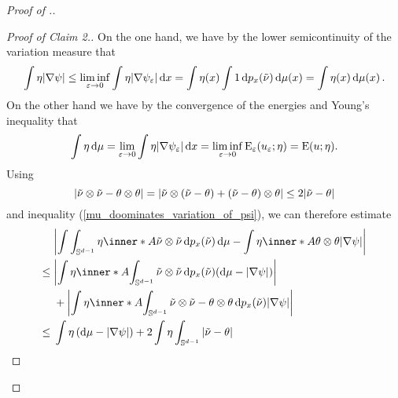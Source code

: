 \begin{proof}[Proof of .]
\begin{proof}[Proof of Claim 2.]
		On the one hand, we have by the lower semicontinuity of the variation 
		measure that
		\begin{equation}
			\label{mu_doominates_variation_of_psi}
			\int
			\eta
			\abs{ \nabla \psi }
			\leq
			\liminf_{ \varepsilon \to 0 }
			\int
			\eta
			\abs{ \nabla \psi_{ \varepsilon } }
			\dd{ x }
			=
			\int
			\eta ( x )
			\int
			1
			\dd{ p_{ x } ( \tilde{ \nu } ) }
			\dd{ \mu ( x ) }
			=
			\int
			\eta ( x ) 
			\dd{ \mu ( x ) }.
		\end{equation}
		On the other hand we have by the convergence of the energies and 
		Young's inequality that
		\begin{equation}
			\label{mu_is_dominated_by_energy}
			\int
			\eta
			\dd{ \mu }
			=
			\lim_{ \varepsilon \to 0 }
			\int
			\eta
			\abs{ \nabla \psi_{ \varepsilon } }
			\dd{ x }
			=
			\liminf_{ \varepsilon \to 0 }
			\operatorname{E}_{ \varepsilon } ( u_{ \varepsilon } ; \eta )
			=
			\operatorname{E} ( u ; \eta ).
		\end{equation}
		Using
		\begin{equation*} 
			\abs{ \tilde{ \nu } \otimes \tilde{ \nu } - \theta \otimes \theta } 
			= 
			\abs{ 
				\tilde{ \nu } \otimes ( \tilde{ \nu } - \theta ) 
				+
				( \tilde{ \nu } - \theta ) \otimes \theta
			}
			\leq
			2 \abs{ \tilde{ \nu } - \theta }
		\end{equation*}
		and inequality (\ref{mu_doominates_variation_of_psi}), we can therefore 
		estimate
		\begin{align*}
			&
			\abs{ 
				\int
				\int_{ \mathbb{ S }^{ d - 1 } }
				\eta
				\inner*{ A }{ \tilde{ \nu } \otimes \tilde{ \nu } }
				\dd{ p_{ x } ( \tilde{ \nu } ) }
				\dd{ \mu }
				-
				\int
				\eta
				\inner*{ A }{ \theta \otimes \theta }
				\abs{ \nabla \psi }
			}
			\\
			\leq{} &
			\abs{ 
				\int
				\eta 
				\inner*{ A }
				{ 
					\int_{ \mathbb{ S }^{ d - 1 } }
					\tilde{ \nu } \otimes \tilde{ \nu }
					\dd{ p_{ x } ( \tilde{ \nu } ) }
				}
				( \dd{ \mu } - \abs{ \nabla \psi } )
			}
			\\
			&+
			\abs{
				\int
				\eta
				\inner*{ A }{
					\int_{ \mathbb{ S }^{ d - 1 } }
					\tilde{ \nu } \otimes \tilde{ \nu }
					-
					\theta \otimes \theta
					\dd{ p_{ x } ( \tilde{ \nu } ) }
				}
				\abs{ \nabla \psi }
			}
			\\
			\leq {} &
			\int
			\eta
			\left( \dd{ \mu } - \abs{ \nabla \psi } \right)
			+
			2
			\int
			\eta
			\int_{ \mathbb{ S }^{ d - 1 } }
			\abs{ \tilde{ \nu } - \theta } 

\end{align*}
\end{proof}
\end{proof}
